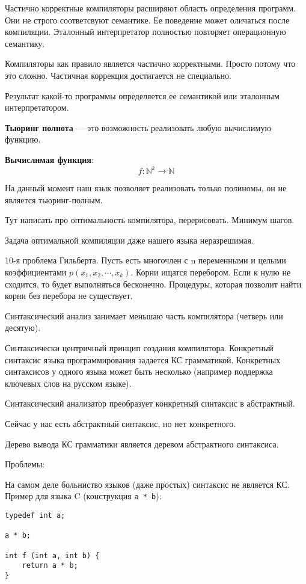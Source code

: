 Частично корректные компиляторы расширяют область определения программ. Они не
строго соответсвуют семантике. Ее поведение может оличаться после компиляции.
Эталонный интерпретатор полностью повторяет операционную семантику.

Компиляторы как правило является частично корректными. Просто потому что это
сложно. Частичная коррекция достигается не специально.

Результат какой-то программы определяется ее семантикой или эталонным
интерпретатором.

\textbf{Тьюринг полнота} --- это возможность реализовать любую вычислимую функцию.

\textbf{Вычислимая функция}:
\[
    f: \mathbb{N}^k \to \mathbb{N}
\]

На данный момент наш язык позволяет реализовать только полиномы, он не является
тьюринг-полным.

Тут написать про оптимальность компилятора, перерисовать. Минимум шагов.

Задача оптимальной компиляции даже нашего языка неразрешимая. 

10-я проблема Гильберта. Пусть есть многочлен с n переменными и целыми
коэффициентами $p(x_1, x_2, \cdots, x_k)$. Корни ищатся перебором. Если к нулю
не сходится, то будет выполняться бесконечно. Процедуры, которая позволит найти
корни без перебора не существует.

Синтаксический анализ занимает меньшаю часть компилятора (четверь или десятую).

Синтаксически центричный принцип создания компилятора. Конкретный синтаксис языка
программирования задается КС грамматикой. Конкретных синтаксисов у одного языка
может быть несколько (например поддержка ключевых слов на русском языке).

Синтаксический анализатор преобразует конкретный синтаксис в абстрактный.

Сейчас у нас есть абстрактный синтаксис, но нет конкретного.

Дерево вывода КС грамматики является деревом абстрактного синтаксиса.

Проблемы:

На самом деле больниство языков (даже простых) синтаксис не является КС.
Пример для языка C (конструкция \texttt{a * b}):
\begin{verbatim}
typedef int a;

a * b;

int f (int a, int b) {
    return a * b;
}
\end{verbatim}

